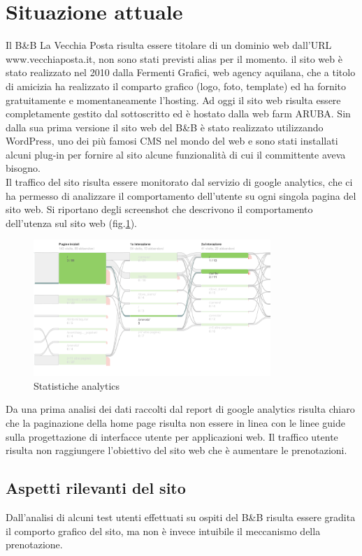 \documentclass[a4paper,12pt,hidelinks]{report}
\begin{document}
\section{Situazione attuale}
Il B\&B La Vecchia Posta risulta essere titolare di un dominio web dall'URL www.vecchiaposta.it, non sono stati previsti alias per il momento. il sito web è stato realizzato nel 2010 dalla Fermenti Grafici, web agency aquilana, che a titolo di amicizia ha realizzato
il comparto grafico (logo, foto, template) ed ha fornito gratuitamente e momentaneamente l'hosting. 
Ad oggi il sito web risulta essere completamente gestito dal sottoscritto ed è hostato dalla web farm ARUBA.
Sin dalla sua prima versione il sito web del B\&B è stato  realizzato utilizzando WordPress, uno dei più famosi CMS nel mondo del web e sono stati installati alcuni plug-in per fornire al sito alcune funzionalità 
di cui il committente aveva bisogno. \\
Il traffico del sito risulta essere monitorato dal servizio di google analytics, che ci ha permesso di analizzare il comportamento dell'utente su ogni singola pagina del sito web. Si riportano degli screenshot che descrivono il comportamento
dell'utenza sul sito web (fig.\ref{fig:analytics1}).

\begin{figure}[h!]
   \includegraphics[width=0.8\textwidth,keepaspectratio=true]{img/googleAnalytics1}
   \centering
   \caption{Statistiche analytics}%
   \label{fig:analytics1}%
\end{figure}
Da una prima analisi dei dati raccolti dal report di google analytics risulta chiaro che la paginazione della home page risulta non essere in linea con le linee guide sulla progettazione di interfacce utente per applicazioni web.
Il traffico utente risulta non raggiungere l'obiettivo del sito web che è aumentare le prenotazioni.

\subsection{Aspetti rilevanti del sito}
Dall'analisi di alcuni test utenti effettuati su ospiti del B\&B risulta essere gradita il comporto grafico del sito, ma non è invece intuibile il meccanismo della prenotazione.
\end{document}
